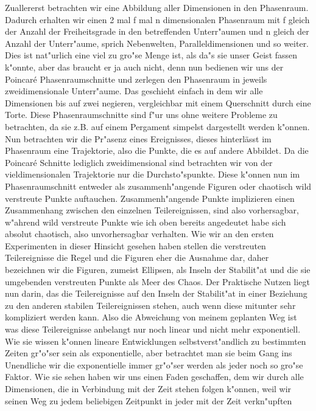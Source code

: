 \documentclass[a5paper,8pt]{book}
\begin{document}
Zuallererst betrachten wir eine Abbildung aller Dimensionen in den Phasenraum. Dadurch erhalten wir einen 2 mal f mal n dimensionalen Phasenraum mit f gleich der Anzahl 
der Freiheitsgrade in den betreffenden Unterr"aumen und n gleich der Anzahl der Unterr"aume, sprich Nebenwelten, Paralleldimensionen und so weiter. Dies ist nat"urlich eine 
viel zu gro"se Menge ist, als da"s sie unser Geist fassen k"onnte, aber das braucht er ja auch nicht, denn nun bedienen wir uns der Poincaré Phasenraumschnitte und zerlegen 
den Phasenraum in jeweils zweidimensionale Unterr"aume. Das geschieht einfach in dem wir alle Dimensionen bis auf zwei negieren, vergleichbar mit einem Querschnitt durch 
eine Torte. Diese Phasenraumschnitte sind f"ur uns ohne weitere Probleme zu betrachten, da sie z.B. auf einem Pergament simpelst dargestellt werden k"onnen.
Nun betrachten wir die Pr"asenz eines Ereignisses, dieses hinterlässt im Phasenraum eine Trajektorie, also die Punkte, die es auf andere Abbildet. Da die Poincaré Schnitte 
lediglich zweidimensional sind betrachten wir von der vieldimensionalen Trajektorie nur die Durchsto"spunkte. Diese k"onnen nun im Phasenraumschnitt entweder als 
zusammenh"angende Figuren oder chaotisch wild verstreute Punkte auftauchen. Zusammenh"angende Punkte implizieren einen Zusammenhang zwischen den einzelnen Teilereignissen, 
sind also vorhersagbar, w"ahrend wild verstreute Punkte wie ich oben bereits angedeutet habe sich absolut chaotisch, also unvorhersagbar verhalten. Wie wir an den ersten 
Experimenten in dieser Hinsicht gesehen haben stellen die verstreuten Teilereignisse die Regel und die Figuren eher die Ausnahme dar, daher bezeichnen wir die Figuren, 
zumeist Ellipsen, als Inseln der Stabilit"at und die sie umgebenden verstreuten Punkte als Meer des Chaos.
Der Praktische Nutzen liegt nun darin, das die Teilereignisse auf den Inseln der Stabilit"at in einer Beziehung zu den anderen stabilen Teilereignissen stehen, auch wenn 
diese mitunter sehr kompliziert werden kann. Also die Abweichung von meinem geplanten Weg ist was diese Teilereignisse 
anbelangt nur noch linear und nicht mehr exponentiell. Wie sie wissen k"onnen lineare Entwicklungen selbstverst"andlich zu bestimmten Zeiten gr"o"ser sein als exponentielle, 
aber betrachtet man sie beim Gang ins Unendliche wir die exponentielle immer gr"o"ser werden als jeder noch so gro"se Faktor. Wie sie sehen haben wir uns einen Faden geschaffen, 
dem wir durch alle Dimensionen, die in Verbindung mit der Zeit stehen folgen k"onnen, weil wir seinen Weg zu jedem beliebigen Zeitpunkt in jeder mit der Zeit verkn"upften 
\end{document}
